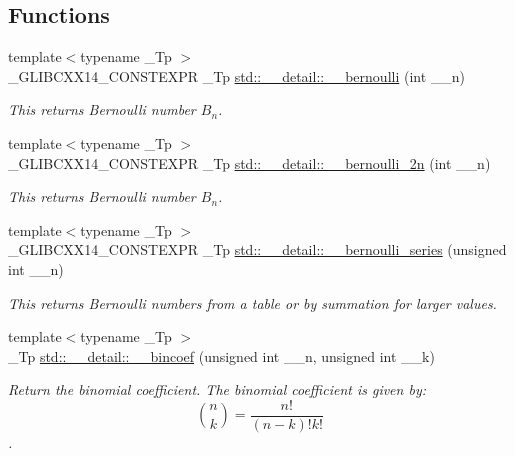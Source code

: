 \subsection*{Functions}
\begin{DoxyCompactItemize}
\item 
{\footnotesize template$<$typename \+\_\+\+Tp $>$ }\\\+\_\+\+G\+L\+I\+B\+C\+X\+X14\+\_\+\+C\+O\+N\+S\+T\+E\+X\+P\+R \+\_\+\+Tp \hyperlink{namespacestd_1_1____detail_a5dc6cb42a6bcd3258371b6cc93ee12f0}{std\+::\+\_\+\+\_\+detail\+::\+\_\+\+\_\+bernoulli} (int \+\_\+\+\_\+n)
\begin{DoxyCompactList}\small\item\em This returns Bernoulli number $B_n$. \end{DoxyCompactList}\item 
{\footnotesize template$<$typename \+\_\+\+Tp $>$ }\\\+\_\+\+G\+L\+I\+B\+C\+X\+X14\+\_\+\+C\+O\+N\+S\+T\+E\+X\+P\+R \+\_\+\+Tp \hyperlink{namespacestd_1_1____detail_a72c7ddb85ace9619af583ca2acdb0a9b}{std\+::\+\_\+\+\_\+detail\+::\+\_\+\+\_\+bernoulli\+\_\+2n} (int \+\_\+\+\_\+n)
\begin{DoxyCompactList}\small\item\em This returns Bernoulli number $B_n$. \end{DoxyCompactList}\item 
{\footnotesize template$<$typename \+\_\+\+Tp $>$ }\\\+\_\+\+G\+L\+I\+B\+C\+X\+X14\+\_\+\+C\+O\+N\+S\+T\+E\+X\+P\+R \+\_\+\+Tp \hyperlink{namespacestd_1_1____detail_ad3d3e44d340742b0362a8ad95080d315}{std\+::\+\_\+\+\_\+detail\+::\+\_\+\+\_\+bernoulli\+\_\+series} (unsigned int \+\_\+\+\_\+n)
\begin{DoxyCompactList}\small\item\em This returns Bernoulli numbers from a table or by summation for larger values. \end{DoxyCompactList}\item 
{\footnotesize template$<$typename \+\_\+\+Tp $>$ }\\\+\_\+\+Tp \hyperlink{namespacestd_1_1____detail_ab0888bd3901e6501b1f451d6adcf967a}{std\+::\+\_\+\+\_\+detail\+::\+\_\+\+\_\+bincoef} (unsigned int \+\_\+\+\_\+n, unsigned int \+\_\+\+\_\+k)
\begin{DoxyCompactList}\small\item\em Return the binomial coefficient. The binomial coefficient is given by\+: \[ \binom{n}{k} = \frac{n!}{(n-k)! k!} \]. \end{DoxyCompactList}\item 

\end{DoxyCompactItemize}
